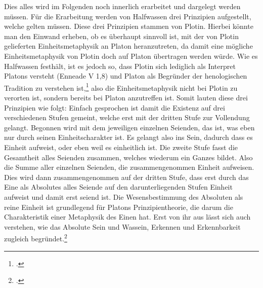 Dies alles wird im Folgenden noch innerlich erarbeitet und dargelegt werden müssen.
Für die Erarbeitung werden von Halfwassen drei Prinzipien aufgestellt, welche gelten müssen.
Diese drei Prinzipien stammen von Plotin. Hierbei könnte man den Einwand erheben, ob es überhaupt sinnvoll ist, mit der von Plotin gelieferten Einheitsmetaphysik an Platon heranzutreten, da damit eine mögliche Einheitsmetaphysik von Plotin doch auf Platon übertragen werden würde. Wie es Halfwassen festhält, ist es jedoch so, dass Plotin sich lediglich als Interpret Platons versteht (Enneade V 1,8) und Platon als Begründer der henologischen Tradition zu verstehen ist,\footcite[vgl.][S. 92]{halfwassen2015spuren} also die Einheitsmetaphysik nicht bei Plotin zu verorten ist, sondern bereits bei Platon anzutreffen ist.
Somit lauten diese drei Prinzipien wie folgt:
Einfach gesprochen ist damit die Existenz auf drei verschiedenen Stufen gemeint, welche erst mit der dritten Stufe zur Vollendung gelangt. Begonnen wird mit dem jeweiligen einzelnen Seienden, das ist, was eben nur durch seinen Einheitscharakter ist. Es gelangt also ins Sein, dadurch dass es Einheit aufweist, oder eben weil es einheitlich ist. Die zweite Stufe fasst die Gesamtheit alles Seienden zusammen, welches wiederum ein Ganzes bildet. Also die Summe aller einzelnen Seienden, die zusammengenommen Einheit aufweisen. Dies wird dann zusammengenommen auf der dritten Stufe, dass erst durch das Eine als Absolutes alles Seiende auf den darunterliegenden Stufen Einheit aufweist und damit erst seiend ist. 
Die Wesensbestimmung des Absoluten als reine Einheit ist grundlegend für Platons Prinzipientheorie, die darum die Charakteristik einer Metaphysik des Einen hat. Erst von ihr aus lässt sich auch verstehen, wie das Absolute Sein und Wassein, Erkennen und Erkennbarkeit zugleich begründet.\footcite[vgl.][S. 96]{halfwassen2015spuren}
